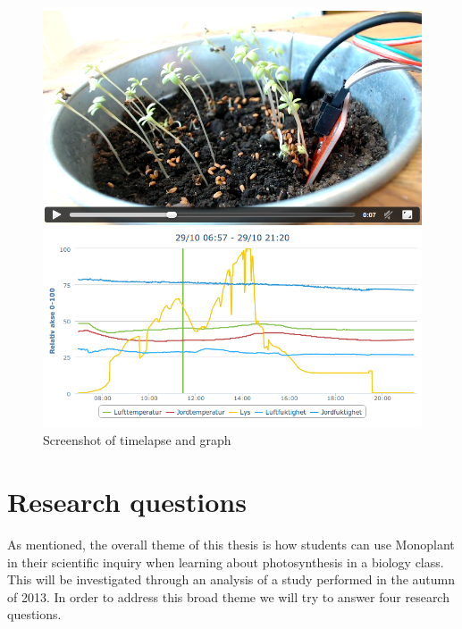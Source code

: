 \begin{figure}
	\centering
	\includegraphics[width=\textwidth]{img/introduction/graphlapse.png}
	\caption{Screenshot of timelapse and graph}
	\label{fig:scrshotgraphlapse}
\end{figure}


\section{Research questions}
As mentioned, the overall theme of this thesis is how students can use Monoplant in their scientific inquiry when learning about photosynthesis in a biology class. This will be investigated through an analysis of a study performed in the autumn of 2013. In order to address this broad theme we will try to answer four research questions.


